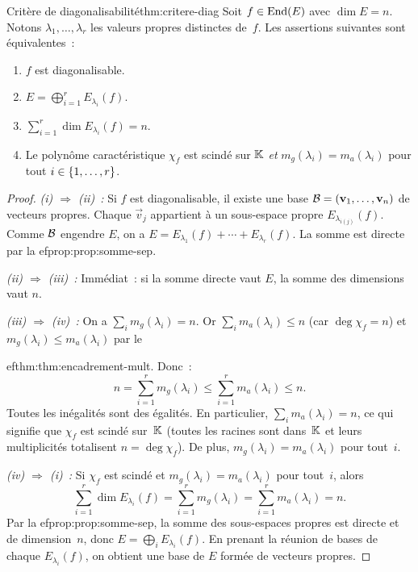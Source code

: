 \begin{theorem}{Critère de diagonalisabilité}{thm:critere-diag}
  Soit $f\in\operatorname{End}(E)$ avec $\dim E=n$. Notons
  $\lambda_1,\ldots,\lambda_r$ les valeurs propres distinctes de~$f$.
  Les assertions suivantes sont équivalentes~:
  \begin{enumerate}[label=(\roman*)]
    \item $f$ est diagonalisable.
    \item $E=\bigoplus_{i=1}^{r}E_{\lambda_i}(f)$.
    \item $\sum_{i=1}^{r}\dim E_{\lambda_i}(f)=n$.
    \item Le polynôme caractéristique $\chi_f$ est scindé sur ${\mathbb{K}}$
      \emph{et} $m_g(\lambda_i)=m_a(\lambda_i)$ pour tout
      $i\in\left\{1,\ldots,r\right\}$.
  \end{enumerate}
\end{theorem}

\begin{proof}
  \emph{(i) $\Rightarrow$ (ii)~:} Si $f$ est diagonalisable, il existe
  une base ${\mathcal{B}}=(\mathbf{v}_1,\ldots,\mathbf{v}_n)$ de vecteurs propres.
  Chaque $\vec{v}_j$ appartient à un sous-espace propre
  $E_{\lambda_{i(j)}}(f)$. Comme ${\mathcal{B}}$ engendre $E$, on a
  $E=E_{\lambda_1}(f)+\cdots+E_{\lambda_r}(f)$. La somme est directe
  par la 
ef{prop:prop:somme-sep}.

  \emph{(ii) $\Rightarrow$ (iii)~:} Immédiat~: si la somme directe
  vaut $E$, la somme des dimensions vaut $n$.

  \emph{(iii) $\Rightarrow$ (iv)~:} On a $\sum_i m_g(\lambda_i)=n$.
  Or $\sum_i m_a(\lambda_i)\leq n$ (car $\deg\chi_f=n$) et
  $m_g(\lambda_i)\leq m_a(\lambda_i)$ par le
  
ef{thm:thm:encadrement-mult}. Donc~:
  \[
    n=\sum_{i=1}^r m_g(\lambda_i)\leq\sum_{i=1}^r m_a(\lambda_i)\leq n.
  \]
  Toutes les inégalités sont des égalités. En particulier,
  $\sum_i m_a(\lambda_i)=n$, ce qui signifie que $\chi_f$ est scindé
  sur~${\mathbb{K}}$ (toutes les racines sont dans~${\mathbb{K}}$ et leurs multiplicités
  totalisent $n=\deg\chi_f$). De plus,
  $m_g(\lambda_i)=m_a(\lambda_i)$ pour tout~$i$.

  \emph{(iv) $\Rightarrow$ (i)~:} Si $\chi_f$ est scindé et
  $m_g(\lambda_i)=m_a(\lambda_i)$ pour tout~$i$, alors
  \[
    \sum_{i=1}^r\dim E_{\lambda_i}(f)=\sum_{i=1}^r m_g(\lambda_i)
    =\sum_{i=1}^r m_a(\lambda_i)=n.
  \]
  Par la 
ef{prop:prop:somme-sep}, la somme des sous-espaces propres est
  directe et de dimension~$n$, donc $E=\bigoplus_i E_{\lambda_i}(f)$.
  En prenant la réunion de bases de chaque $E_{\lambda_i}(f)$, on
  obtient une base de $E$ formée de vecteurs propres.
\end{proof}

